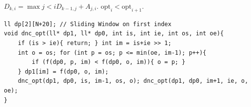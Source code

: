 $D_{k,i} = \max{j<i} D_{k-1,j} + A_{j,i}$. $\mathrm{opt}_i < \mathrm{opt}_{i+1}$.

\begin{verbatim}
ll dp[2][N+20]; // Sliding Window on first index
void dnc_opt(ll* dp1, ll* dp0, int is, int ie, int os, int oe){
	if (is > ie){ return; } int im = is+ie >> 1;
	int o = os; for (int p = os; p <= min(oe, im-1); p++){
		if (f(dp0, p, im) < f(dp0, o, im)){ o = p; }
	} dp1[im] = f(dp0, o, im);
	dnc_opt(dp1, dp0, is, im-1, os, o); dnc_opt(dp1, dp0, im+1, ie, o, oe);
}
\end{verbatim}